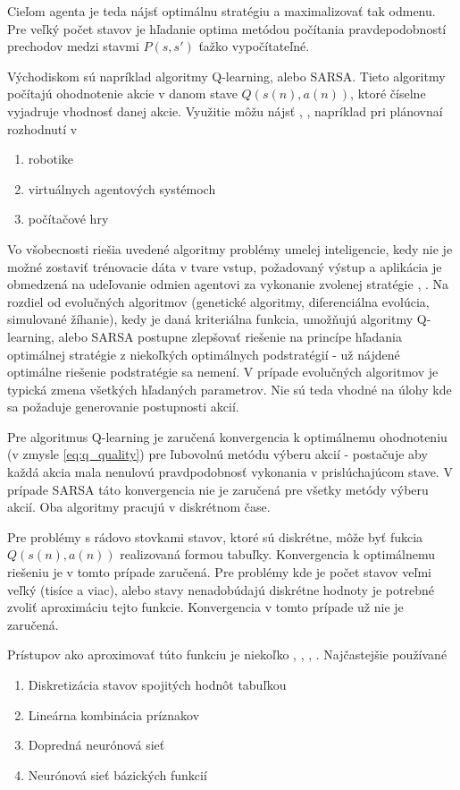 Cieľom agenta je teda nájsť optimálnu stratégiu a maximalizovať tak odmenu.
Pre veľký počet stavov je hľadanie optima metódou počítania
pravdepodobností prechodov medzi stavmi $P(s, s')$ ťažko vypočítateľné.

Východiskom sú napríklad algoritmy Q-learning, alebo SARSA. Tieto algoritmy počítajú
ohodnotenie akcie v danom stave $Q(s(n), a(n))$, ktoré číselne vyjadruje vhodnosť
danej akcie. Využitie môžu nájsť \cite{bib:q_app_01}, \cite{bib:q_app_02}, \cite{bib:q_app_03} napríklad pri plánovnaí rozhodnutí v
\begin{enumerate}
  \item robotike
  \item virtuálnych agentových systémoch
  \item počítačové hry
\end{enumerate}

Vo všobecnosti riešia uvedené algoritmy problémy umelej inteligencie, kedy
nie je možné zostaviť trénovacie dáta v tvare vstup, požadovaný výstup a aplikácia
je obmedzená na udeľovanie odmien agentovi za vykonanie zvolenej stratégie
\cite{bib:reinforcement_leraning_01}, \cite{bib:reinforcement_leraning_02}. Na rozdiel
od evolučných algoritmov (genetické algoritmy, diferenciálna evolúcia, simulované žíhanie),
kedy je daná kriteriálna funkcia, umožňujú algoritmy Q-learning, alebo SARSA
postupne zlepšovať riešenie na princípe hľadania optimálnej stratégie z niekoľkých
optimálnych podstratégií - už nájdené optimálne riešenie podstratégie sa nemení. V prípade evolučných
algoritmov je typická zmena všetkých hľadaných parametrov. Nie sú teda vhodné
na úlohy kde sa požaduje generovanie postupnosti akcií.

Pre algoritmus Q-learning je zaručená konvergencia k optimálnemu
ohodnoteniu (v zmysle \ref{eq:q_quality}) \cite{bib:q_conv_proof}
pre ľubovolnú metódu výberu
akcií - postačuje aby každá akcia mala nenulovú pravdpodobnosť vykonania v prislúchajúcom
stave. V prípade SARSA táto konvergencia nie je zaručená pre všetky metódy výberu akcií.
Oba algoritmy pracujú v diskrétnom čase.

Pre problémy s rádovo stovkami stavov, ktoré sú diskrétne, môže byť fukcia $Q(s(n), a(n))$ realizovaná
formou tabuľky. Konvergencia k optimálnemu riešeniu je v tomto prípade zaručená.
Pre problémy kde je počet stavov veľmi veľký (tisíce a viac), alebo stavy nenadobúdajú
diskrétne hodnoty je potrebné zvoliť aproximáciu tejto funkcie. Konvergencia v tomto
prípade už nie je zaručená.

Prístupov ako aproximovať túto funkciu je niekoľko \cite{bib:aproximation_01},
\cite{bib:aproximation_02}, \cite{bib:aproximation_03}, \cite{bib:aproximation_04}.
Najčastejšie používané
\begin{enumerate}
  \item Diskretizácia stavov spojitých hodnôt tabuľkou
  \item Lineárna kombinácia príznakov
  \item Dopredná neurónová sieť
  \item Neurónová sieť bázických funkcií
\end{enumerate}


